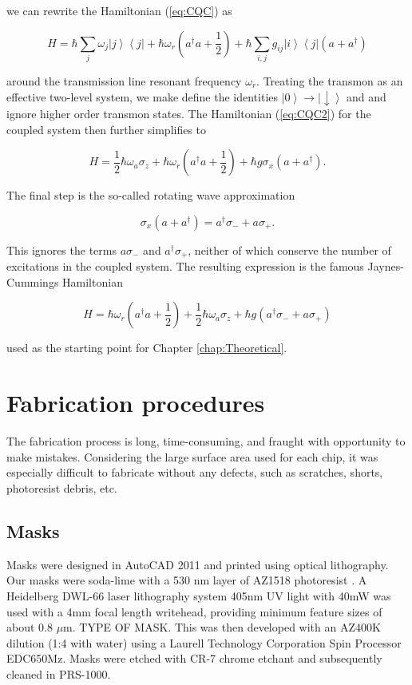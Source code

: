 \documentclass[11 pt, oneside]{book} %
\newcommand{\ket}[1]{\left| #1 \right>} %
\newcommand{\bra}[1]{\left< #1 \right|} %
\begin{document}
we can rewrite the Hamiltonian (\ref{eq:CQC}) as

\begin{equation}\label{eq:CQC2}
H=\hbar\sum_j\omega_j\ket{j}\bra{j}+\hbar\omega_r\left(a^{\dag}a+\frac{1}{2}\right)+\hbar\sum_{i,j}g_{ij}\ket{i}\bra{j}(a+a^{\dag})
\end{equation}

around the transmission line resonant frequency $\omega_r$. Treating the transmon as an effective two-level system, we make define the identities $\ket{0}\rightarrow\ket{\downarrow}$ and and ignore higher order transmon states. The Hamiltonian (\ref{eq:CQC2}) for the coupled system then further simplifies to

\begin{equation}
H=\frac{1}{2}\hbar\omega_a\sigma_z+\hbar\omega_r\left(a^{\dag}a+\frac{1}{2}\right)+\hbar g\sigma_x(a+a^{\dag}).
\end{equation}

The final step is the so-called rotating wave approximation

\begin{equation}
\sigma_x(a+a^{\dag})=a^{\dag}\sigma_- + a\sigma_+.
\end{equation}

This ignores the terms $a\sigma_-$ and $a^{\dag}\sigma_+$, neither of which conserve the number of excitations in the coupled system. The resulting expression is the famous Jaynes-Cummings Hamiltonian 

\begin{equation}
H=\hbar \omega_r\left(a^\dag a + \frac{1}{2}\right) + \frac{1}{2}\hbar \omega_a \sigma_z + \hbar g(a^\dag \sigma_- + a\sigma_+)
\end{equation}

used as the starting point for Chapter \ref{chap:Theoretical}. 

\section{Fabrication procedures}
The fabrication process is long, time-consuming, and fraught with opportunity to make mistakes. Considering the large surface area used for each chip, it was especially difficult to fabricate without any defects, such as scratches, shorts, photoresist debris, etc. 

\subsection{Masks}
Masks were designed in AutoCAD 2011 and printed using optical lithography. Our masks were soda-lime  with a 530 nm layer of AZ1518 photoresist . A Heidelberg DWL-66 laser lithography system 405nm UV light with 40mW was used with a 4mm focal length writehead, providing minimum feature sizes of about 0.8 $\mu$m. TYPE OF MASK. This was then developed with an AZ400K dilution (1:4 with water) using a Laurell Technology Corporation Spin Processor EDC650Mz. Masks were etched with CR-7 chrome etchant and subsequently cleaned in PRS-1000. 
\end{document}
